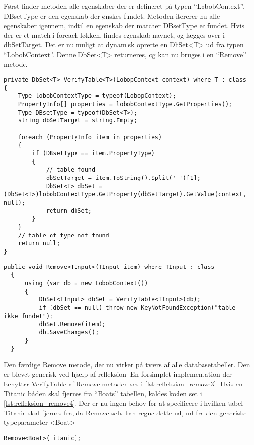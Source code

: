 Først finder metoden alle egenskaber der er defineret på typen \enquote{LobobContext}. DBsetType er den egenskab der ønskes fundet. Metoden itererer nu alle egenskaber igennem, indtil en egenskab der matcher DBsetType er fundet. Hvis der er et match i foreach løkken, findes egenskab navnet, og lægges over i dbSetTarget. Det er nu muligt at dynamisk oprette en DbSet<T> ud fra typen \enquote{LobobContext}. Denne DbSet<T> returneres, og kan nu bruges i en \enquote{Remove} metode.

\begin{lstlisting}[label=lst:refleksion_verifytable, caption={Metode der tjekker om en tabel af typen T findes i databasen.}]
private DbSet<T> VerifyTable<T>(LobopContext context) where T : class
{
    Type lobobContextType = typeof(LobopContext);
    PropertyInfo[] properties = lobobContextType.GetProperties();
    Type DBsetType = typeof(DbSet<T>);
    string dbSetTarget = string.Empty;

    foreach (PropertyInfo item in properties)
    {
        if (DBsetType == item.PropertyType)
        {
            // table found
            dbSetTarget = item.ToString().Split(' ')[1];
            DbSet<T> dbSet = (DbSet<T>)lobobContextType.GetProperty(dbSetTarget).GetValue(context, null);
            return dbSet;
        }
    }
    // table of type not found
    return null;
}
\end{lstlisting}

\begin{lstlisting}[label=lst:refleksion_remove3, caption={Remove metode der kan tage en vilkårlig klasse ind, finde den rette tabel og derefter slette det parametiserede objekt}]
  public void Remove<TInput>(TInput item) where TInput : class
  {
      using (var db = new LobobContext())
      {
          DbSet<TInput> dbSet = VerifyTable<TInput>(db);
          if (dbSet == null) throw new KeyNotFoundException("table ikke fundet");
          dbSet.Remove(item);
          db.SaveChanges();
      }
  } 
\end{lstlisting}

Den færdige Remove metode, der nu virker på tværs af alle databasetabeller. Den er blevet generisk ved hjælp af refleksion. En forsimplet implementation der benytter VerifyTable af Remove metoden ses i \cref{lst:refleksion_remove3}. Hvis en Titanic båden skal fjernes fra \enquote{Boats} tabellen, kaldes koden set i \cref{lst:refleksion_remove4}. Der er nu ingen behov for at specificere i hvilken tabel Titanic skal fjernes fra, da Remove selv kan regne dette ud, ud fra den generiske typeparameter <Boat>.

\begin{lstlisting}[label=lst:refleksion_remove4]
Remove<Boat>(titanic);
\end{lstlisting}
